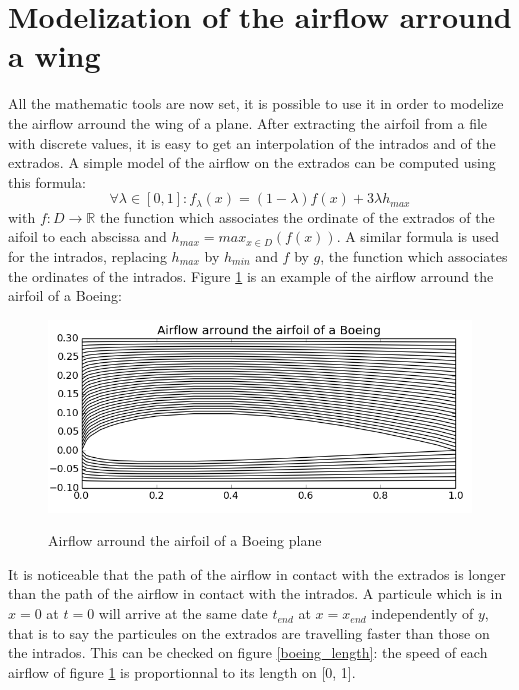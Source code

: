 \documentclass{article}
\begin{document}
\section{Modelization of the airflow arround a wing}

All the mathematic tools are now set, it is possible to use it in order to modelize the airflow arround the wing of a plane. After extracting the airfoil from a file with discrete values, it is easy to get an interpolation of the intrados and of the extrados. A simple model of the airflow on the extrados can be computed using this formula:
\begin{equation}
\forall \lambda \in [0,1]: f_{\lambda}(x) = (1-\lambda)f(x) + 3\lambda h_{max}
\end{equation}
with $f: D \to \mathbb{R}$ the function which associates the ordinate of the extrados of the aifoil to each abscissa and $h_{max} = max_{x \in D}(f(x))$. A similar formula is used for the intrados, replacing $h_{max}$ by $h_{min}$ and $f$ by $g$, the function which associates the ordinates of the intrados. Figure \ref{boeing_airflow} is an example of the airflow arround the airfoil of a Boeing:

\begin{figure}[h]
  \centering
  \caption{Airflow arround the airfoil of a Boeing plane}
  \includegraphics[width=14cm]{boeing_airflow}
  \label{boeing_airflow}
\end{figure}

\newpage

It is noticeable that the path of the airflow in contact with the extrados is longer than the path of the airflow in contact with the intrados. A particule which is in $x = 0$ at $t = 0$ will arrive at the same date $t_{end}$ at $x = x_{end}$ independently of $y$, that is to say the particules on the extrados are travelling faster than those on the intrados. This can be checked on figure \ref{boeing_length}: the speed of each airflow of figure \ref{boeing_airflow} is proportionnal to its length on [0, 1].
\end{document}
